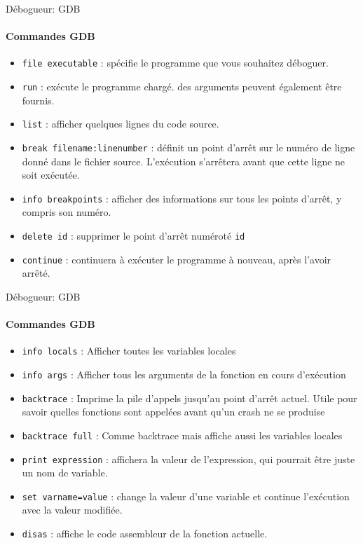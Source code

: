 \begin{frame}{Débogueur: GDB}
	\framesubtitle{Commandes GDB}
	\begin{itemize}
		\item \alert{\texttt{file executable}} : spécifie le programme que vous souhaitez déboguer.
		\item \alert{\texttt{run}} : exécute le programme chargé. des arguments peuvent également être fournis.
		\item \alert{\texttt{list}} : afficher quelques lignes du code source.
		\item \alert{\texttt{break filename:linenumber}} : définit un point d'arrêt sur le numéro de ligne donné dans le fichier source. L'exécution s'arrêtera avant que cette ligne ne soit exécutée.
		\item \alert{\texttt{info breakpoints}} : afficher des informations sur tous les points d'arrêt, y compris son numéro.
		\item \alert{\texttt{delete id}} : supprimer le point d'arrêt numéroté \alert{\texttt{id}}
		\item \alert{\texttt{continue}} : continuera à exécuter le programme à nouveau, après l'avoir arrêté.
	\end{itemize}
\end{frame}

\begin{frame}{Débogueur: GDB}
	\framesubtitle{Commandes GDB}
	\begin{itemize}
		\item \alert{\texttt{info locals}} : Afficher toutes les variables locales
		\item \alert{\texttt{info args}} : Afficher tous les arguments de la fonction en cours d'exécution
		\item \alert{\texttt{backtrace}} : Imprime la pile d'appels jusqu'au point d'arrêt actuel. Utile pour savoir quelles fonctions sont appelées avant qu'un crash ne se produise
		\item \alert{\texttt{backtrace full}} : Comme backtrace mais affiche aussi les variables locales
		\item \alert{\texttt{print expression}} : affichera la valeur de l'expression, qui pourrait être juste un nom de variable.
		\item \alert{\texttt{set varname=value}} : change la valeur d'une variable et continue l'exécution avec la valeur modifiée.
		\item \alert{\texttt{disas}} : affiche le code assembleur de la fonction actuelle.
	\end{itemize}
\end{frame}


